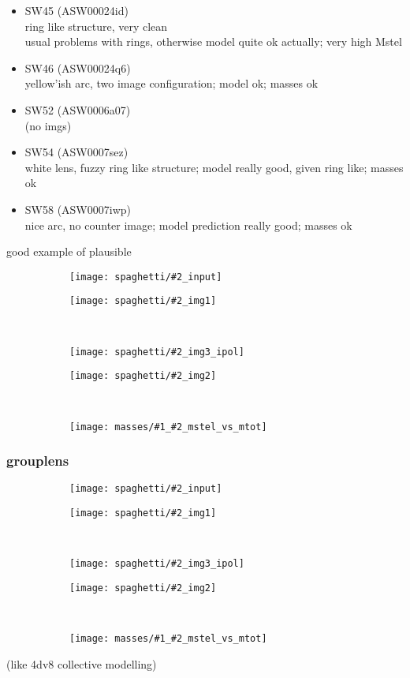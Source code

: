\documentclass[fleqn,usenatbib]{mnras}
\newcommand{\inclfig}[2]{
  \centering
  \begin{subfigure}{0.5\linewidth}
    \texttt{[image: spaghetti/\#2\_input]}
  \end{subfigure}%
  \begin{subfigure}{0.5\linewidth}
    \texttt{[image: spaghetti/\#2\_img1]}
  \end{subfigure}%
  \\[-1px]%
  \begin{subfigure}{0.5\linewidth}
    \texttt{[image: spaghetti/\#2\_img3\_ipol]}
  \end{subfigure}%
  \begin{subfigure}{0.5\linewidth}
    \texttt{[image: spaghetti/\#2\_img2]}
  \end{subfigure}%
  \\[-1px]%
  \begin{subfigure}[b]{\linewidth}
    \texttt{[image: masses/\#1\_\#2\_mstel\_vs\_mtot]}
  \end{subfigure}
}
\begin{document}
\begin{itemize}
  \item SW45 (ASW00024id)\\
  ring like structure, very clean \\
  usual problems with rings, otherwise model quite ok actually;
  very high Mstel
  
  \item SW46 (ASW00024q6) \\
  yellow'ish arc, two image configuration;
  model ok;
  masses ok
  
  \item SW52 (ASW0006a07) \\
  (no imgs)
  
  \item SW54 (ASW0007sez) \\
  white lens, fuzzy ring like structure;
  model really good, given ring like;
  masses ok
  
  \item SW58 (ASW0007iwp) \\
  nice arc, no counter image;
  model prediction really good;
  masses ok
  
\end{itemize}

good example of plausible


\begin{figure}
  \inclfig{SW58}{ASW0007iwp_4XBJWT3COV}
  \caption{}
\end{figure}


\subsubsection{grouplens}

\begin{figure}
  \inclfig{SW36}{ASW000096t_7IPP7LWVOF}
\end{figure}

(like 4dv8 collective modelling)
\end{document}
